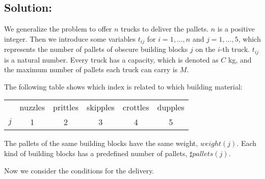 \documentclass[11pt]{article}
\begin{document}
\vspace{4mm}

\subsection*{Solution:}

We generalize the problem to offer $n$ trucks to deliver the pallets. $n$ is a positive integer. Then we introduce some variables $t_{ij}$ for $i = 1, ..., n$ and $j = 1,...,5$, which represents the number of pallets of obscure building blocks $j$ on the $i$-th truck. $t_{ij}$ is a natural number. Every truck has a capacity, which is denoted as $C$ kg, and the maximum number of pallets each truck can carry is $M$.

The following table shows which index is related to which building material:

\begin{center}
\begin{tabular}{|c|c|c|c|c|c|}
  \hline
    & nuzzles & prittles & skipples & crottles & dupples \\
  $j$ & 1 & 2 & 3 & 4 & 5 \\
  \hline
\end{tabular}
\end{center}

The pallets of the same building blocks have the same weight, $weight(j)$. Each kind of building blocks has a predefined number of pallets, $\sharp pallets(j)$.

Now we consider the conditions for the delivery.
\end{document}
